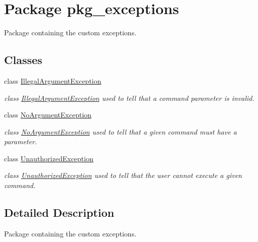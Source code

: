 \hypertarget{namespacepkg__exceptions}{\section{Package pkg\-\_\-exceptions}
\label{namespacepkg__exceptions}
}


Package containing the custom exceptions.  


\subsection*{Classes}
\begin{DoxyCompactItemize}
\item 
class \hyperlink{classpkg__exceptions_1_1IllegalArgumentException}{Illegal\-Argument\-Exception}
\begin{DoxyCompactList}\small\item\em class \hyperlink{classpkg__exceptions_1_1IllegalArgumentException}{Illegal\-Argument\-Exception} used to tell that a command parameter is invalid. \end{DoxyCompactList}\item 
class \hyperlink{classpkg__exceptions_1_1NoArgumentException}{No\-Argument\-Exception}
\begin{DoxyCompactList}\small\item\em class \hyperlink{classpkg__exceptions_1_1NoArgumentException}{No\-Argument\-Exception} used to tell that a given command must have a parameter. \end{DoxyCompactList}\item 
class \hyperlink{classpkg__exceptions_1_1UnauthorizedException}{Unauthorized\-Exception}
\begin{DoxyCompactList}\small\item\em class \hyperlink{classpkg__exceptions_1_1UnauthorizedException}{Unauthorized\-Exception} used to tell that the user cannot execute a given command. \end{DoxyCompactList}\end{DoxyCompactItemize}


\subsection{Detailed Description}
Package containing the custom exceptions. 